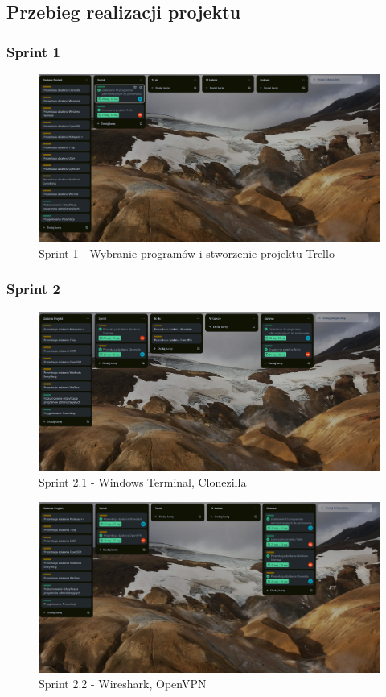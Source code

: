 \documentclass[0.82pt,a4paper]{article}
\begin{document}
\subsection{Przebieg realizacji projektu}
\subsubsection{Sprint 1}

    \begin{figure}[H]
        \centering
        \includegraphics[width=0.8\linewidth]{media/Trello_screeny/Sprint1.PNG}
        \caption[sprint1]{Sprint 1 - Wybranie programów i stworzenie projektu Trello}
        \label{fig:sprint1}
    \end{figure}
    
\subsubsection{Sprint 2}

    \begin{figure}[H]
        \centering
        \includegraphics[width=0.8\linewidth]{media/Trello_screeny/Sprint2_1.PNG}
        \caption[Sprint2.1]{Sprint 2.1 - Windows Terminal, Clonezilla}
        \label{fig:sprint2_1}
    \end{figure}

    \begin{figure}[H]
        \centering
        \includegraphics[width=0.8\linewidth]{media/Trello_screeny/Sprint2_2.PNG}
        \caption[Sprint2.2]{Sprint 2.2 - Wireshark, OpenVPN}
        \label{fig:sprint2_2}
    \end{figure}
    
\end{document}
